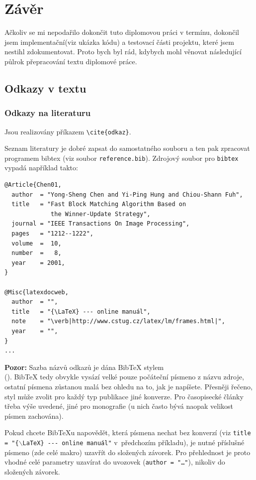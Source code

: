 \documentclass[11pt,twoside,a4paper]{book}
\begin{document}
\chapter{Závěr}
Ačkoliv se mi nepodařilo dokončit tuto diplomovou práci v termínu, dokončil jsem
implementační(viz ukázka kódu) a testovací části projektu, které jsem nestihl
zdokumentovat. Proto bych byl rád, kdybych mohl věnovat následující půlrok
přepracování textu diplomové práce.


\section{Odkazy v textu}
\subsection{Odkazy na literaturu}
Jsou realizovány příkazem \verb|\cite{odkaz}|. 

Seznam literatury je dobré zapsat do samostatného souboru a ten pak zpracovat programem bibtex (viz soubor \verb|reference.bib|). Zdrojový soubor pro \verb|bibtex| vypadá například takto:
\begin{verbatim}
@Article{Chen01,
  author  = "Yong-Sheng Chen and Yi-Ping Hung and Chiou-Shann Fuh",
  title   = "Fast Block Matching Algorithm Based on 
             the Winner-Update Strategy",
  journal = "IEEE Transactions On Image Processing",
  pages   = "1212--1222",
  volume  =  10,
  number  =   8,
  year    = 2001,
}

@Misc{latexdocweb,
  author  = "",
  title   = "{\LaTeX} --- online manuál",
  note    = "\verb|http://www.cstug.cz/latex/lm/frames.html|",
  year    = "",
}
...
\end{verbatim}

\textbf{Pozor:} Sazba názvů odkazů je dána Bib\TeX{} stylem\\ (\verb||). 
Bib\TeX{} tedy obvykle vysází velké pouze počáteční písmeno z názvu zdroje, 
ostatní písmena zůstanou malá bez ohledu na to, jak je napíšete. 
Přesněji řečeno, styl může zvolit pro každý typ publikace jiné konverze. 
Pro časopisecké články třeba výše uvedené, jiné pro monografie (u nich často bývá 
naopak velikost písmen zachována).

Pokud chcete Bib\TeX u napovědět, která písmena nechat bez konverzí 
(viz \texttt{title = "\{$\backslash$LaTeX\} -{}-{}- online manuál"} 
v~předchozím příkladu), je nutné příslušné písmeno (zde celé makro) uzavřít 
do složených závorek. Pro přehlednost je proto vhodné celé parametry 
uzavírat do uvozovek (\texttt{author = "\dots"}), nikoliv do složených závorek.
\end{document}
